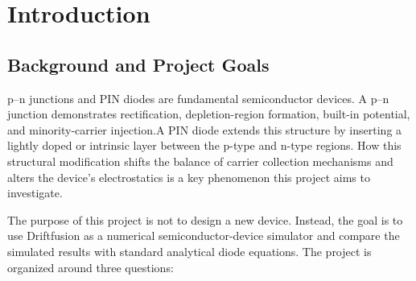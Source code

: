 \documentclass[11pt,a4paper]{article}
\newcommand{\jzero}{J_0}
\newcommand{\jsc}{J_{SC}}
\newcommand{\voc}{V_{OC}}
\newcommand{\vbi}{V_{bi}}
\begin{document}
\begin{abstract}
This project uses the Driftfusion one-dimensional drift-diffusion simulator to verify standard diode physics for silicon p--n junctions and PIN diodes, with particular attention to where textbook analytical models remain accurate and where they begin to miss non-ideal effects. The numerical workflow consists of equilibrium simulation, dark current-voltage sweeps, and illuminated current-voltage sweeps. From these simulations, the built-in potential $\vbi$, depletion width $W$, saturation current density $\jzero$, short-circuit current density $\jsc$, and open-circuit voltage $\voc$ are extracted and compared with analytical diode models. The equilibrium electrostatic quantities agree well with analytical formulas, showing that Poisson/depletion theory captures the junction electrostatics robustly. In contrast, current-related quantities such as $\jzero$ are more sensitive to finite device thickness, surface recombination, SRH recombination, and numerical extraction criteria. PIN diode simulations show that increasing the intrinsic-layer thickness increases generation volume and widens the depleted region, supporting drift-based carrier collection. Overall, the deviations are the most informative part of the comparison because they show which quantities are robustly captured by simple formulas and which require numerical drift-diffusion simulation.
\end{abstract}

\tableofcontents
\newpage

\section{Introduction}

\subsection{Background and Project Goals}

p--n junctions and PIN diodes are fundamental semiconductor devices. A p--n junction demonstrates rectification, depletion-region formation, built-in potential, and minority-carrier injection.A PIN diode extends this structure by inserting a lightly doped or intrinsic layer between the p-type and n-type regions. How this structural modification shifts the balance of carrier collection mechanisms and alters the device's electrostatics is a key phenomenon this project aims to investigate.

The purpose of this project is not to design a new device. Instead, the goal is to use Driftfusion as a numerical semiconductor-device simulator and compare the simulated results with standard analytical diode equations. The project is organized around three questions:
\end{document}
